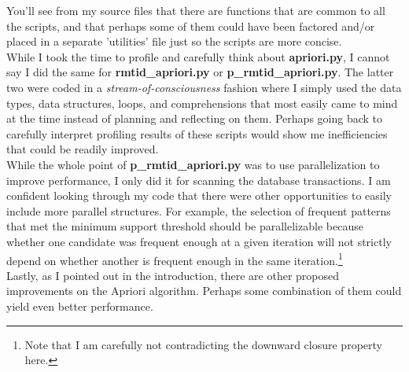 \documentclass[12 pt]{article}
\begin{document}
You'll see from my source files that there are functions that are common to all the scripts, and that perhaps some of them could have been factored and/or placed in a separate 'utilities' file just so the scripts are more concise.\\

While I took the time to profile and carefully think about \textbf{apriori.py}, I cannot say I did the same for \textbf{rmtid\_apriori.py} or \textbf{p\_rmtid\_apriori.py}. The latter two were coded in a \textit{stream-of-consciousness} fashion where I simply used the data types, data structures, loops, and comprehensions that most easily came to mind at the time instead of planning and reflecting on them. Perhaps going back to carefully interpret profiling results of these scripts would show me inefficiencies that could be readily improved.\\

While the whole point of \textbf{p\_rmtid\_apriori.py} was to use parallelization to improve performance, I only did it for scanning the database transactions. I am confident looking through my code that there were other opportunities to easily include more parallel structures. For example, the selection of frequent patterns that met the minimum support threshold should be parallelizable because whether one candidate was frequent enough at a given iteration will not strictly depend on whether another is frequent enough in the same iteration.\footnote{Note that I am carefully not contradicting the downward closure property here.}\\

Lastly, as I pointed out in the introduction, there are other proposed improvements on the Apriori algorithm. Perhaps some combination of them could yield even better performance.

\pagebreak

{}
\end{document}
